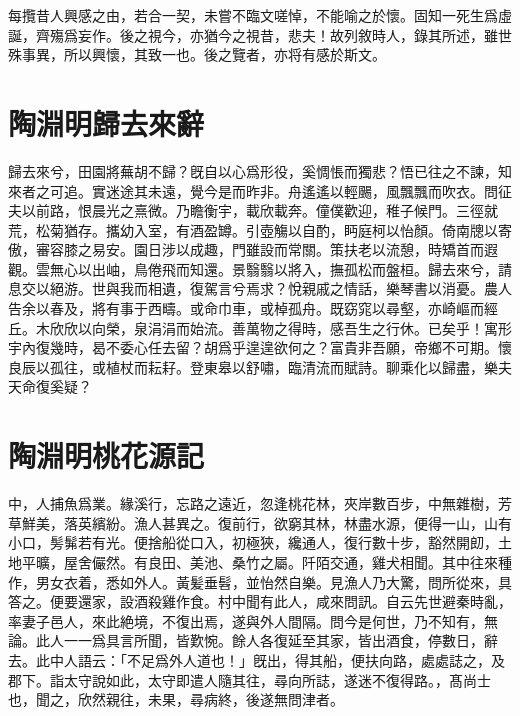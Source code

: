 每攬昔人興感之由，若合一契，未嘗不臨文嗟悼，不能喻之於懷。固知一死生爲虛誕，齊殤爲妄作。後之視今，亦猶今之視昔，悲夫！故列敘時人，錄其所述，雖世殊事異，所以興懷，其致一也。後之覽者，亦将有感於斯文。

\theendnotes

\section[歸去來辭\quad{\small 陶淵明}]{{\normalsize 陶淵明}\quad 歸去來辭}
歸去來兮，田園將蕪胡不歸？旣自以心爲形役，奚惆悵而獨悲？悟已往之不諫，知來者之可追。實迷途其未遠，覺今是而昨非。舟遙遙以輕颺，風飄飄而吹衣。問征夫以前路，恨晨光之熹微。乃瞻衡宇，載欣載奔。僮僕歡迎，稚子候門。三徑就荒，松菊猶存。攜幼入室，有酒盈罇。引壺觴以自酌，眄庭柯以怡顏。倚南牕以寄傲，審容膝之易安。園日涉以成趣，門雖設而常關。策扶老以流憩，時矯首而遐觀。雲無心以出岫，鳥倦飛而知還。景翳翳以將入，撫孤松而盤桓。歸去來兮，請息交以絕游。世與我而相遺，復駕言兮焉求？悅親戚之情話，樂琴書以消憂。農人告余以春及，將有事于西疇。或命巾車，或棹孤舟。既窈窕以尋壑，亦崎嶇而經丘。木欣欣以向榮，泉涓涓而始流。善萬物之得時，感吾生之行休。已矣乎！寓形宇內復幾時，曷不委心任去留？胡爲乎遑遑欲何之？富貴非吾願，帝鄉不可期。懷良辰以孤往，或植杖而耘耔。登東皋以舒嘯，臨清流而賦詩。聊乘化以歸盡，樂夫天命復奚疑？ 

\theendnotes

\section[桃花源記\quad{\small 陶淵明}]{{\normalsize 陶淵明}\quad 桃花源記}
中，人捕魚爲業。緣溪行，忘路之遠近，忽逢桃花林，夾岸數百步，中無雜樹，芳草鮮美，落英繽紛。漁人甚異之。復前行，欲窮其林，林盡水源，便得一山，山有小口，髣髴若有光。便捨船從口入，初極狹，纔通人，復行數十步，豁然開㓪，土地平曠，屋舍儼然。有良田、美池、桑竹之屬。阡陌交通，雞犬相聞。其中往來種作，男女衣着，悉如外人。黃髪垂髫，並怡然自樂。見漁人乃大驚，問所從來，具答之。便要還家，設酒殺雞作食。村中聞有此人，咸來問訊。自云先世避秦時亂，率妻子邑人，來此絶境，不復出焉，遂與外人間隔。問今是何世，乃不知有，無論。此人一一爲具言所聞，皆歎惋。餘人各復延至其家，皆出酒食，停數日，辭去。此中人語云：「不足爲外人道也！」旣出，得其船，便扶向路，處處誌之，及郡下。詣太守說如此，太守即遣人隨其往，尋向所誌，遂迷不復得路。，髙尚士也，聞之，欣然親往，未果，尋病終，後遂無問津者。

